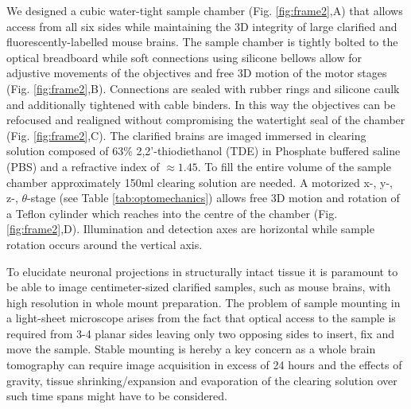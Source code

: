 \documentclass[12pt]{spieman}  %
\begin{document}
We designed a cubic water-tight sample chamber (Fig. \ref{fig:frame2},A) that allows access from all six sides while maintaining the 3D integrity of large clarified and fluorescently-labelled mouse brains. The sample chamber is tightly bolted  to the optical breadboard while soft connections using silicone bellows allow for adjustive movements of the objectives and free 3D motion of the motor stages (Fig. \ref{fig:frame2},B). Connections are sealed with rubber rings and silicone caulk and additionally tightened with cable binders. In this way the objectives can be refocused and realigned without compromising the watertight seal of the chamber (Fig. \ref{fig:frame2},C). The clarified brains are imaged immersed in clearing solution composed of 63\% 2,2'-thiodiethanol (TDE) in Phosphate buffered saline (PBS) and a refractive index of $\approx 1.45$\cite{Costantini}. To fill the entire volume of the sample chamber approximately 150ml clearing solution are needed. A motorized x-, y-, z-, $\theta$-stage (see Table \ref{tab:optomechanics}) allows free 3D motion and rotation of a Teflon cylinder which reaches into the centre of the chamber (Fig. \ref{fig:frame2},D). Illumination and detection axes are horizontal while sample rotation occurs around the vertical axis.		
		
To elucidate neuronal projections in structurally intact tissue it is paramount to be able to image centimeter-sized clarified samples, such as mouse brains, with high resolution in whole mount preparation. %
The problem of sample mounting in a light-sheet microscope arises from the fact that optical access to the sample is required from 3-4 planar sides leaving only two opposing sides to insert, fix and move the sample. %
Stable mounting is hereby a key concern as a whole brain tomography can require image acquisition in excess of 24 hours and the effects of gravity, tissue shrinking/expansion and evaporation of the clearing solution over such time spans might have to be considered. 
\end{document}
